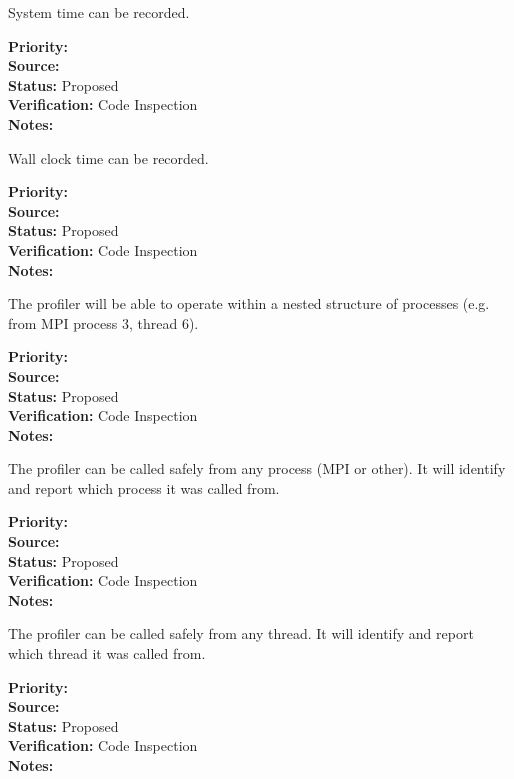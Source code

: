 System time can be recorded.

\begin{reqlist}
{\bf Priority:}  \\
{\bf Source:}  \\
{\bf Status:} Proposed \\
{\bf Verification:} Code Inspection \\
{\bf Notes:} 
\end{reqlist}



Wall clock time can be recorded.

\begin{reqlist}
{\bf Priority:}  \\
{\bf Source:}  \\
{\bf Status:} Proposed \\
{\bf Verification:} Code Inspection \\
{\bf Notes:} 
\end{reqlist}


The profiler will be able to operate within a nested structure of processes (e.g.
from MPI process 3, thread 6).

\begin{reqlist}
{\bf Priority:}  \\
{\bf Source:}  \\
{\bf Status:} Proposed \\
{\bf Verification:} Code Inspection \\
{\bf Notes:} 
\end{reqlist}


The profiler can be called safely from any process (MPI or other).  It will 
identify and report which process it was called from.

\begin{reqlist}
{\bf Priority:}  \\
{\bf Source:}  \\
{\bf Status:} Proposed \\
{\bf Verification:} Code Inspection \\
{\bf Notes:} 
\end{reqlist}


The profiler can be called safely from any thread.  It will 
identify and report which thread it was called from.

\begin{reqlist}
{\bf Priority:}  \\
{\bf Source:}  \\
{\bf Status:} Proposed \\
{\bf Verification:} Code Inspection \\
{\bf Notes:} 
\end{reqlist}

